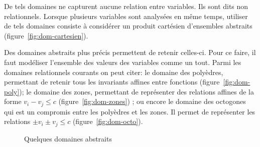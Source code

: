 De tels domaines ne capturent aucune relation entre variables. Ils sont dits non
relationnels. Lorsque plusieurs variables sont analysées en même temps, utiliser
de tels domaines consiste à considérer un produit cartésien d'ensembles
abstraits (figure~\ref{fig:dom-cartesien}).

Des domaines abstraits plus précis permettent de retenir celles-ci. Pour ce
faire, il faut modéliser l'ensemble des valeurs des variables comme un tout.
Parmi les domaines relationnels courants on peut citer: le domaine des
polyèdres, permettant de retenir tous les invariants affines entre fonctions
(figure~\ref{fig:dom-poly}); le domaine des zones, permettant de représenter
des relations affines de la forme $v_i - v_j \le c$ (figure~\ref{fig:dom-zones})
; ou encore le domaine des octogones qui est un compromis entre les polyèdres et
les zones. Il permet de représenter les relations $\pm v_i \pm v_j \le c$
(figure~\ref{fig:dom-octo}).

\begin{figure}%

  \centering

  \subbottom[Domaine des polyèdres]{%
\label{fig:dom-poly}
%
    \begin{tikzpicture}[scale=0.5]
    \path[use as bounding box] (0,0) rectangle (8, 6);
%
    \draw[fill=red!30] (1,2) -- (2,4) -- (4,5) -- (6,5) -- (7,3) -- (5,1) -- cycle;
%
    \end{tikzpicture}
  }%

  \subbottom[Domaine des zones]{%
\label{fig:dom-zones}
%
    \begin{tikzpicture}
    \path[use as bounding box] (0,0) rectangle (4,4);
%
    \draw[fill=red!30] (1,2) -- (2,3) -- (3,3) -- (3,2) -- (2,1) -- (1,1) -- cycle;
%
    \end{tikzpicture}
  }%
  \subbottom[Domaine des octaèdres]{%
\label{fig:dom-octo}
%
    \begin{tikzpicture}
    \path[use as bounding box] (0,0) rectangle (4,4);
%
    \draw[fill=red!30] (1,1.5) -- (1,2) -- (2,3) -- (2.5,3) -- (3,2.5) -- (3,2) -- (2,1) -- (1.5,1) -- cycle;
%
    \end{tikzpicture}
  }%

  \caption{Quelques domaines abstraits}
\label{fig:dom-abstraits}
\end{figure}%

